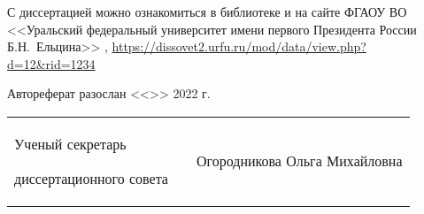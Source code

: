 \vspace{0.008\paperheight plus1fill}
С диссертацией можно ознакомиться в библиотеке
и на сайте ФГАОУ ВО
<<Уральский федеральный университет имени первого Президента России Б.Н.~Ельцина>>%
,
\url{https://dissovet2.urfu.ru/mod/data/view.php?d=12&rid=1234}

\vspace{0.008\paperheight plus1fill}
{
Автореферат разослан
<<\underline{\hspace{2em}}>>
\underline{\hspace{7em}}
2022 г.}

\vspace{0.008\paperheight plus1fill}
\noindent%
\begin{tabularx}{\textwidth}{@{}%
>{\raggedright\arraybackslash}b{18em}@{}
>{\centering\arraybackslash}X
r
@{}}
    Ученый секретарь\par
    диссертационного совета
    &
    &
    Огородникова Ольга Михайловна
\end{tabularx}


\clearpage

